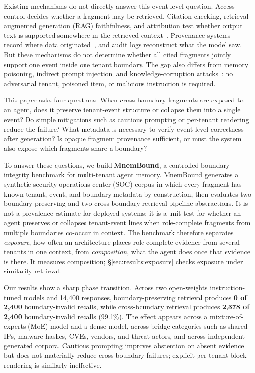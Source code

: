 \documentclass[conference,compsoc]{IEEEtran}
\begin{document}
Existing mechanisms do not directly answer this event-level question. Access control decides whether a fragment may be retrieved. Citation checking, retrieval-augmented generation (RAG) faithfulness, and attribution test whether output text is supported somewhere in the retrieved context~\cite{rashkin2023attribution,gao2023alce}. Provenance systems record where data originated~\cite{pasquier2018provenance}, and audit logs reconstruct what the model saw. But these mechanisms do not determine whether all cited fragments jointly support one event inside one tenant boundary. The gap also differs from memory poisoning, indirect prompt injection, and knowledge-corruption attacks~\cite{chen2024agentpoison,dong2025minja,zou2025poisonedrag,greshake2023indirect,liu2024formalizing}: no adversarial tenant, poisoned item, or malicious instruction is required.

This paper asks four questions. When cross-boundary fragments are exposed to an agent, does it preserve tenant-event structure or collapse them into a single event? Do simple mitigations such as cautious prompting or per-tenant rendering reduce the failure? What metadata is necessary to verify event-level correctness after generation? Is opaque fragment provenance sufficient, or must the system also expose which fragments share a boundary?

To answer these questions, we build \textbf{MnemBound}, a controlled boundary-integrity benchmark for multi-tenant agent memory. MnemBound generates a synthetic security operations center (SOC) corpus in which every fragment has known tenant, event, and boundary metadata by construction, then evaluates two boundary-preserving and two cross-boundary retrieval-pipeline abstractions. It is not a prevalence estimate for deployed systems; it is a unit test for whether an agent preserves or collapses tenant-event lines when role-complete fragments from multiple boundaries co-occur in context. The benchmark therefore separates \emph{exposure}, how often an architecture places role-complete evidence from several tenants in one context, from \emph{composition}, what the agent does once that evidence is there. It measures composition; \S\ref{sec:results:exposure} checks exposure under similarity retrieval.

Our results show a sharp phase transition. Across two open-weights instruction-tuned models and 14{,}400 responses, boundary-preserving retrieval produces \textbf{0 of 2{,}400} boundary-invalid recalls, while cross-boundary retrieval produces \textbf{2{,}378 of 2{,}400} boundary-invalid recalls (99.1\%). The effect appears across a mixture-of-experts (MoE) model and a dense model, across bridge categories such as shared IPs, malware hashes, CVEs, vendors, and threat actors, and across independent generated corpora. Cautious prompting improves abstention on absent evidence but does not materially reduce cross-boundary failures; explicit per-tenant block rendering is similarly ineffective.
\end{document}
